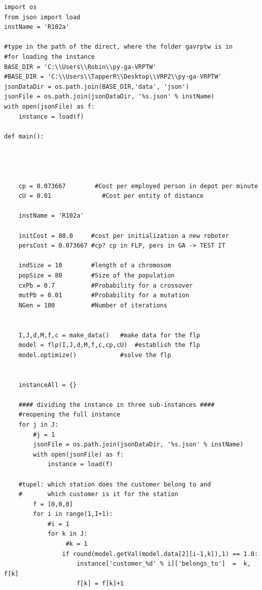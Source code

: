 \documentclass[a4paper,12pt,parskip,bibtotoc,liststotoc]{article}
\begin{document}
\begin{appendix}
\begin{lstlisting}
import os
from json import load
instName = 'R102a'

#type in the path of the direct, where the folder gavrptw is in
#for loading the instance
BASE_DIR = 'C:\\Users\\Robin\\py-ga-VRPTW'
#BASE_DIR = 'C:\\Users\\TapperR\\Desktop\\VRP2\\py-ga-VRPTW'
jsonDataDir = os.path.join(BASE_DIR,'data', 'json')
jsonFile = os.path.join(jsonDataDir, '%s.json' % instName)
with open(jsonFile) as f:
    instance = load(f)

def main():

    
    
    
    cp = 0.073667        #Cost per employed person in depot per minute
    cU = 0.01              #Cost per entity of distance 
        
    instName = 'R102a'
    
    initCost = 80.0     #cost per initialization a new roboter
    persCost = 0.073667 #cp? cp in FLP, pers in GA -> TEST IT
    
    indSize = 10        #length of a chromosom
    popSize = 80        #Size of the population
    cxPb = 0.7          #Probability for a crossover
    mutPb = 0.01        #Probability for a mutation
    NGen = 100          #Number of iterations 
    
    
    I,J,d,M,f,c = make_data()   #make data for the flp
    model = flp(I,J,d,M,f,c,cp,cU)  #establish the flp
    model.optimize()            #solve the flp
    

    instanceAll = {}
    
    #### dividing the instance in three sub-instances ####
    #reopening the full instance
    for j in J:  
        #j = 1        
        jsonFile = os.path.join(jsonDataDir, '%s.json' % instName)
        with open(jsonFile) as f:
            instance = load(f)
    
    #tupel: which station does the customer belong to and
    #       which customer is it for the station           
        f = [0,0,0] 
        for i in range(1,I+1):
            #i = 1
            for k in J:
                 #k = 1
                if round(model.getVal(model.data[2][i-1,k]),1) == 1.0:
                    instance['customer_%d' % i]['belongs_to']  =  k, f[k]
                    f[k] = f[k]+1 


\end{lstlisting}
\end{appendix}
\end{document}
